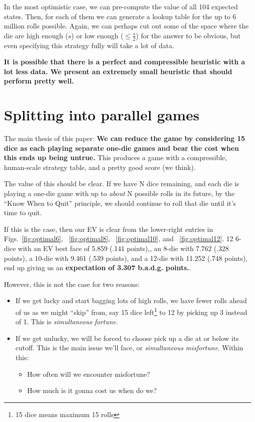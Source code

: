 \documentclass[11pt, oneside]{article} 	%
\begin{document}
In the most optimistic case, we can pre-compute the value of all 104 expected states.  Then, for each of them we can generate a lookup table for the up to 6 million rolls possible.  Again, we can perhaps cut out some of the space where the die are high enough ($s$) or low enough ($\leq \frac{s}{2}$) for the answer to be obvious, but even specifying this strategy fully will take a lot of data.  

\textbf{It is possible that there is a perfect and compressible heuristic with a lot less data. We present an extremely small heuristic that should perform pretty well.}

\section{Splitting into parallel games} \label{section:split-out}

The main thesis of this paper: \textbf{We can reduce the game by considering 15 dice as each playing separate one-die games and bear the cost when this ends up being untrue.}  This produces a game with a compressible, human-scale strategy table, and a pretty good score (we think).

The value of this should be clear.  If we have N dice remaining, and each die is playing a one-die game with up to \emph{about} N possible rolls in its future, by the ``Know When to Quit'' principle, we should continue to roll that die until it's time to quit.

If this is the case, then our EV is clear from the lower-right entries in Figs.~\ref{fig:optimal6}, ~\ref{fig:optimal8}, ~\ref{fig:optimal10}, and ~\ref{fig:optimal12}.  12 6-dice with an EV best face of 5.859 (.141 points),, an 8-die with 7.762 (.328 points), a 10-die with 9.461 (.539 points), and a 12-die with 11.252 (.748 points), end up giving us an \textbf{expectation of 3.307 b.a.d.g. points.}.

However, this is not the case for two reasons:
\begin{itemize}
\item If we get lucky and start bagging lots of high rolls, we have fewer rolls ahead of us as we might ``skip'' from, say 15 dice left\footnote{15 dice means maximum 15 rolls} to 12 by picking up 3 instead of 1.  This is \emph{simultaneous fortune}.
\item If we get unlucky, we will be forced to choose pick up a die at or below its cutoff.  This is the main issue we'll face, or \emph{simultaneous misfortune}.  Within this:
  \begin{itemize}
  \item How often will we encounter misfortune?
  \item How much is it gonna cost us when do we?
  \end{itemize}
\end{itemize}
\end{document}
